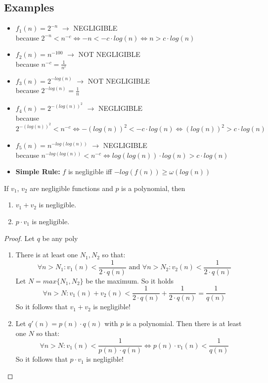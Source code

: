 		\subsection{Examples}
			\begin{itemize}
				\item $f_1(n) = 2^{-n}$ $\rightarrow$ NEGLIGIBLE\\
					because $2^{-n} < n^{-c} \Leftrightarrow -n < -c \cdot log(n) \Leftrightarrow n > c \cdot log(n)$
				\item $f_2(n) = n^{-100}$ $\rightarrow$ NOT NEGLIGIBLE\\
					because $n^{-c} = \frac{1}{n^c}$
				\item $f_3(n) = 2^{-log(n)}$ $\rightarrow$ NOT NEGLIGIBLE\\
					because $2^{-log(n)} = \frac{1}{n}$
				\item $f_4(n) = 2^{-(log(n))^2}$ $\rightarrow$ NEGLIGIBLE\\
					because $2^{-(log(n))^2} < n^{-c} \Leftrightarrow -(log(n))^2 < -c \cdot log(n) \Leftrightarrow (log(n))^2 > c \cdot log(n)$
				\item $f_5(n) = n^{-log(log(n))}$ $\rightarrow$ NEGLIGIBLE\\
					because $n^{-log(log(n))} < n^{-c} \Leftrightarrow log(log(n)) \cdot log(n) > c \cdot log(n)$
				\item \textbf{Simple Rule:} $f$ is negligible iff $-log(f(n)) \geq \omega(log(n))$
			\end{itemize}

		\begin{lemma}
	    	If $v_1$, $v_2$ are negligible functions and $p$ is a polynomial, then
	    	\begin{enumerate}
	    	    \item $v_1 + v_2$ is negligible.
	    	    \item $p \cdot v_1$ is negligible.\newline
	    	\end{enumerate}
		\end{lemma}
		\begin{proof}
			Let $q$ be any poly
			\begin{enumerate}
				\item There is at least one $N_1,N_2$ so that:
						$$\forall n > N_1: v_1(n) < \frac{1}{2 \cdot q(n)} \text{ and } \forall n > N_2: v_2(n) < \frac{1}{2 \cdot q(n)}$$
					Let $N = max\{N_1,N_2\}$ be the maximum. So it holds
						$$\forall n > N: v_1(n)+v_2(n) < \frac{1}{2 \cdot q(n)} + \frac{1}{2 \cdot q(n)} = \frac{1}{q(n)}$$
					So it follows that $v_1 + v_2$ is negligible!
				\item Let $q'(n) = p(n) \cdot q(n)$ with $p$ is a polynomial. 
					Then there is at least one $N$ so that:
						$$\forall n > N: v_1(n) < \frac{1}{p(n) \cdot q(n)} \Leftrightarrow p(n) \cdot v_1(n) < \frac{1}{q(n)}$$
					So it follows that $p \cdot v_1$ is negligible!
			\end{enumerate}
		\end{proof}


